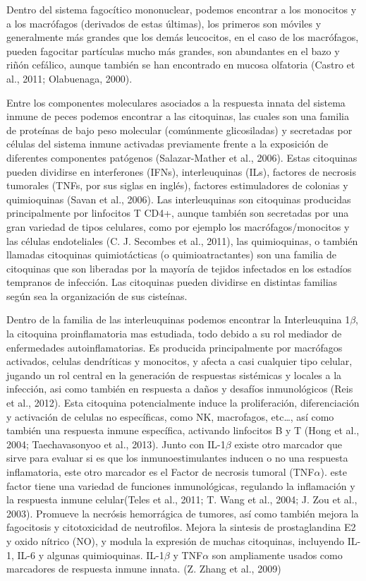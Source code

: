 \documentclass[12pt,a4paper,]{article}
\begin{document}
Dentro del sistema fagocítico mononuclear, podemos encontrar a los
monocitos y a los macrófagos (derivados de estas últimas), los primeros
son móviles y generalmente más grandes que los demás leucocitos, en el
caso de los macrófagos, pueden fagocitar partículas mucho más grandes,
son abundantes en el bazo y riñón cefálico, aunque también se han
encontrado en mucosa olfatoria (Castro et al., 2011; Olabuenaga, 2000).

Entre los componentes moleculares asociados a la respuesta innata del
sistema inmune de peces podemos encontrar a las citoquinas, las cuales
son una familia de proteínas de bajo peso molecular (comúnmente
glicosiladas) y secretadas por células del sistema inmune activadas
previamente frente a la exposición de diferentes componentes patógenos
(Salazar-Mather et al., 2006)⁠. Estas citoquinas pueden dividirse en
interferones (IFNs), interleuquinas (ILs), factores de necrosis
tumorales (TNFs, por sus siglas en inglés), factores estimuladores de
colonias y quimioquinas (Savan et al., 2006)⁠. Las interleuquinas son
citoquinas producidas principalmente por linfocitos T CD4+, aunque
también son secretadas por una gran variedad de tipos celulares, como
por ejemplo los macrófagos/monocitos y las células endoteliales (C. J.
Secombes et al., 2011), las quimioquinas, o también llamadas citoquinas
quimiotácticas (o quimioatractantes) son una familia de citoquinas que
son liberadas por la mayoría de tejidos infectados en los estadíos
tempranos de infección. Las citoquinas pueden dividirse en distintas
familias según sea la organización de sus cisteínas.

Dentro de la familia de las interleuquinas podemos encontrar la
Interleuquina 1$\beta$, la citoquina proinflamatoria mas estudiada, todo
debido a su rol mediador de enfermedades autoinflamatorias. Es producida
principalmente por macrófagos activados, celulas dendríticas y
monocitos, y afecta a casi cualquier tipo celular, jugando un rol
central en la generación de respuestas sistémicas y locales a la
infección, asi como también en respuesta a daños y desafíos
inmunológicos (Reis et al., 2012). Esta citoquina potencialmente induce
la proliferación, diferenciación y activación de celulas no específicas,
como NK, macrofagos, etc\ldots{}, así como también una respuesta inmune
específica, activando linfocitos B y T (Hong et al., 2004;
Taechavasonyoo et al., 2013). Junto con IL-1$\beta$ existe otro marcador
que sirve para evaluar si es que los inmunoestimulantes inducen o no una
respuesta inflamatoria, este otro marcador es el Factor de necrosis
tumoral (TNF$\alpha$). este factor tiene una variedad de funciones
inmunológicas, regulando la inflamación y la respuesta inmune
celular(Teles et al., 2011; T. Wang et al., 2004; J. Zou et al., 2003).
Promueve la necrósis hemorrágica de tumores, así como también mejora la
fagocitosis y citotoxicidad de neutrofilos. Mejora la sintesis de
prostaglandina E2 y oxido nítrico (NO), y modula la expresión de muchas
citoquinas, incluyendo IL-1, IL-6 y algunas quimioquinas. IL-1$\beta$ y
TNF$\alpha$ son ampliamente usados como marcadores de respuesta inmune
innata. (Z. Zhang et al., 2009)
\end{document}
